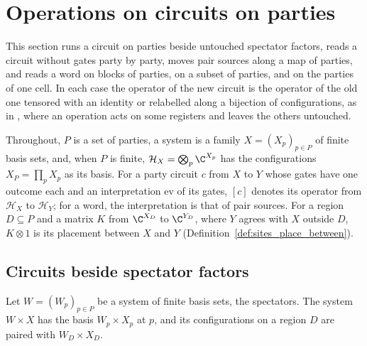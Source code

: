 \section{Operations on circuits on parties}
\label{sec:party_syntax_operations}

This section runs a circuit on parties beside untouched spectator factors, reads
a circuit without gates party by party, moves pair sources along a map of
parties, and reads a word on blocks of parties, on a subset of parties, and on
the parties of one cell. In each case the operator of the new circuit is the
operator of the old one tensored with an identity or relabelled along a
bijection of configurations, as in \cite[Section~5.1]{OpenAI2026PolynomialPEPS},
where an operation acts on some registers and leaves the others untouched.

Throughout, $P$ is a set of parties, a system is a family $X=(X_p)_{p\in P}$ of
finite basis sets, and, when $P$ is finite, $\mathcal H_X=\bigotimes_p\C^{X_p}$
has the configurations $X_P=\prod_pX_p$ as its basis. For a party circuit $c$
from $X$ to $Y$ whose gates have one outcome each and an interpretation
$\mathrm{ev}$ of its gates, $[c]$ denotes its operator from $\mathcal H_X$ to
$\mathcal H_Y$; for a word, the interpretation is that of pair sources. For a
region $D\subseteq P$ and a matrix $K$ from $\C^{X_D}$ to $\C^{Y_D}$, where $Y$
agrees with $X$ outside $D$, $K\otimes1$ is its placement between $X$ and $Y$
(Definition~\ref{def:sites_place_between}).

\subsection{Circuits beside spectator factors}
\label{sec:party_frame}

Let $W=(W_p)_{p\in P}$ be a system of finite basis sets, the spectators. The
system $W\times X$ has the basis $W_p\times X_p$ at $p$, and its configurations
on a region $D$ are paired with $W_D\times X_D$.

